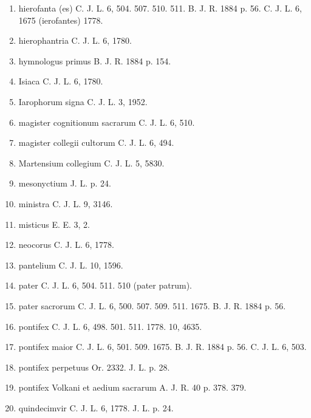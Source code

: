 \documentclass[a4paper, 11pt, oneside, polutonikogreek, german, twocolumn]{article}
\begin{document}
\begin{enumerate}
\item hierofanta (es) C. J. L. 6, 504. 507. 510. 511. B. J. R. 1884 p. 56. C. J. L. 6, 1675 (ierofantes) 1778.

\item hierophantria C. J. L. 6, 1780.

\item hymnologus primus B. J. R. 1884 p. 154.

\item Isiaca C. J. L. 6, 1780.

\item Iarophorum signa C. J. L. 3, 1952.

\item magister cognitionum sacrarum C. J. L. 6, 510.

\item magister collegii cultorum C. J. L. 6, 494.

\item Martensium collegium C. J. L. 5, 5830.

\item mesonyctium J. L. p. 24.

\item ministra C. J. L. 9, 3146.

\item misticus E. E. 3, 2.

\item neocorus C. J. L. 6, 1778.

\item pantelium C. J. L. 10, 1596.

\item pater C. J. L. 6, 504. 511. 510 (pater patrum).

\item pater sacrorum C. J. L. 6, 500. 507. 509. 511. 1675. B. J. R. 1884 p. 56.

\item pontifex C. J. L. 6, 498. 501. 511. 1778. 10, 4635.

\item pontifex maior C. J. L. 6, 501. 509. 1675. B. J. R. 1884 p. 56. C. J. L. 6, 503.

\item pontifex perpetuus Or. 2332. J. L. p. 28.

\item pontifex Volkani et aedium sacrarum A. J. R. 40 p. 378. 379.

\item quindecimvir C. J. L. 6, 1778. J. L. p. 24.


\end{enumerate}
\end{document}
